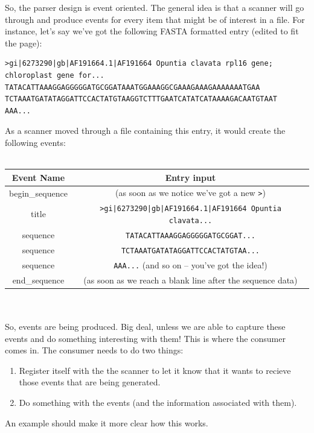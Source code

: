 \documentclass{report}
\begin{document}
So, the parser design is event oriented. The general idea is that a scanner will go through and produce events for every item that might be of interest in a file. For instance, let's say we've got the following FASTA formatted entry (edited to fit the page):


\begin{verbatim}
>gi|6273290|gb|AF191664.1|AF191664 Opuntia clavata rpl16 gene; chloroplast gene for...
TATACATTAAAGGAGGGGGATGCGGATAAATGGAAAGGCGAAAGAAAGAAAAAAATGAA
TCTAAATGATATAGGATTCCACTATGTAAGGTCTTTGAATCATATCATAAAAGACAATGTAAT
AAA...
\end{verbatim}

As a scanner moved through a file containing this entry, it would create the following events:
\\
\\
\begin{tabular}{cc}
Event Name & Entry input \\
\hline
begin\_sequence & (as soon as we notice we've got a new \verb|>|) \\
title & \verb+>gi|6273290|gb|AF191664.1|AF191664 Opuntia clavata...+ \\
sequence & \verb|TATACATTAAAGGAGGGGGATGCGGAT...| \\
sequence & \verb|TCTAAATGATATAGGATTCCACTATGTAA...| \\
sequence & \verb|AAA...| (and so on -- you've got the idea!) \\
end\_sequence & (as soon as we reach a blank line after the sequence data) \\

\end{tabular}
\\
\\
So, events are being produced. Big deal, unless we are able to capture these events and do something interesting with them! This is where the consumer comes in. The consumer needs to do two things:

\begin{enumerate}

\item Register itself with the the scanner to let it know that it wants to recieve those events that are being generated.

\item Do something with the events (and the information associated with them).

\end{enumerate}

An example should make it more clear how this works.
\end{document}
